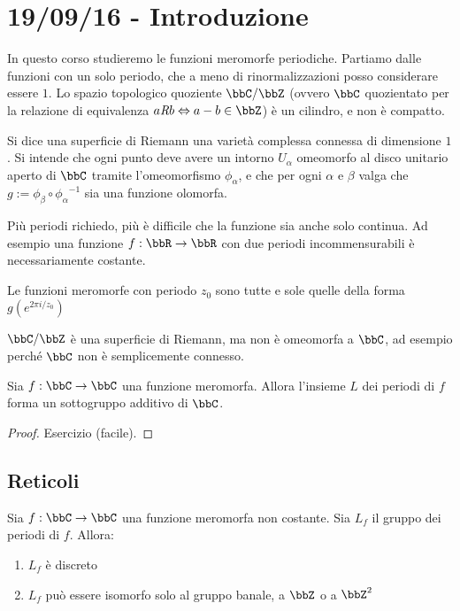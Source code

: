 \chapter{19/09/16 - Introduzione}

In questo corso studieremo le funzioni meromorfe periodiche.
Partiamo dalle funzioni con un solo periodo, che a meno di rinormalizzazioni posso considerare essere $1$.
Lo spazio topologico quoziente $\bbC / \bbZ$ (ovvero $\bbC$ quozientato per la relazione di
equivalenza $a\textit{R}b \sse a-b \in \bbZ$) è un cilindro, e non è compatto.

\begin{definizione}
Si dice una superficie di Riemann una varietà complessa connessa di dimensione $1$.
Si intende che ogni punto deve avere un intorno $U_\alpha$ omeomorfo al disco unitario aperto di $\bbC$
tramite l'omeomorfismo $\phi_\alpha$, e che per ogni $\alpha$ e $\beta$ valga che $g:=\phi_\beta \circ {\phi_\alpha}^{-1}$
sia una funzione olomorfa.
\end{definizione}


\begin{osservazione}
Più periodi richiedo, più è difficile che la funzione sia anche solo continua. Ad esempio una funzione
$f: \bbR \rar \bbR$ con due periodi incommensurabili è necessariamente costante.
\end{osservazione}

\begin{lemma}
Le funzioni meromorfe con periodo $z_0$ sono tutte e sole quelle della forma $g\left(e^{2\pi i/z_0}\right)$
\end{lemma}

\begin{osservazione}
$\bbC / \bbZ$ è una superficie di Riemann, ma non è omeomorfa a $\bbC$, ad esempio perché $\bbC$ non è semplicemente connesso.
\end{osservazione}

\begin{lemma}
Sia $f: \bbC \rar \bbC$ una funzione meromorfa. Allora l'insieme $L$ dei periodi di $f$
forma un sottogruppo additivo di $\bbC$.
\end{lemma}
\begin{proof}
Esercizio (facile).
\end{proof}

\section{Reticoli}
Sia $f: \bbC \rar \bbC$ una funzione meromorfa non costante.
Sia $L_f$ il gruppo dei periodi di $f$. Allora:
\begin{enumerate}
 \item $L_f$ è discreto
 \item $L_f$ può essere isomorfo solo al gruppo banale, a $\bbZ$ o a $\bbZ^2$ 
\end{enumerate}

